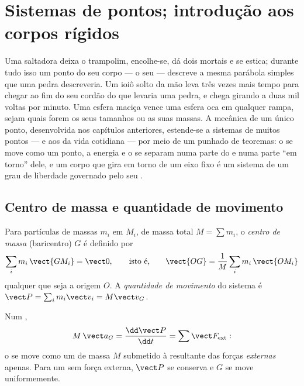 \chapter{Sistemas de pontos; introdução aos corpos rígidos}\label{ch:b1:systems-of-points}

Uma saltadora deixa o trampolim, encolhe-se, dá dois mortais e se estica;
durante tudo isso um ponto do seu corpo --- o seu  ---
descreve a mesma parábola simples que uma pedra descreveria. Um ioiô solto
da mão leva três vezes mais tempo para chegar ao fim do seu cordão do que
levaria uma pedra, e chega girando a duas mil voltas por minuto. Uma esfera
maciça vence uma esfera oca em qualquer rampa, sejam quais forem os seus
tamanhos ou as suas massas. A mecânica de um único ponto, desenvolvida nos
capítulos anteriores, estende-se a sistemas de muitos pontos --- e aos
 da vida cotidiana --- por meio de um punhado de teoremas: o
 se move como um ponto, a energia e o  se
separam numa parte do  e numa parte ``em torno'' dele, e um
corpo que gira em torno de um eixo fixo é um sistema de um grau de
liberdade governado pelo seu .

\section{Centro de massa e quantidade de movimento}

\begin{definition}\label{def:b1:systems-of-points:cm}
Para partículas de massas $m_i$ em $M_i$, de massa total $M = \sum m_i$, o
\emph{centro de massa} (baricentro) $G$ é definido por
\[
\sum_i m_i\,\vect{GM_i} = \vect 0, \qquad\text{isto é,}\qquad
\vect{OG} = \frac{1}{M}\sum_i m_i\,\vect{OM_i}
\]
qualquer que seja a origem $O$. A \emph{quantidade de movimento} do sistema é $\vect P =
\sum_i m_i\vect v_i = M\vect v_G$.
\end{definition}

\begin{theorem}\label{thm:b1:systems-of-points:cmtheorem}
Num ,
\[
M\,\vect a_G = \frac{\dd\vect P}{\dd t} = \sum\vect F_{\mathrm{ext}} :
\]
o  se move como um  de massa $M$ submetido à
resultante das forças \emph{externas} apenas. Para um  sem
força externa, $\vect P$ se conserva e $G$ se move uniformemente.
\end{theorem}


